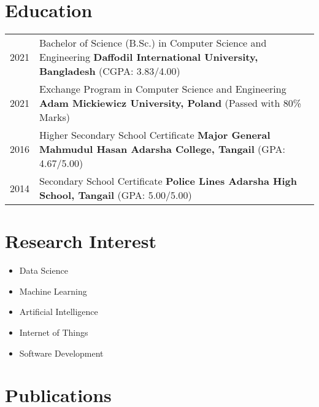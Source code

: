 \documentclass[a4paper, 12pt]{article}
\begin{document}
    \section{\textbf{Education}}
    \begin{tabularx}
    {\linewidth}{@{}l X@{}}
        2021 & Bachelor of Science (B.Sc.) in Computer Science
        and Engineering
        \newline
        \textbf{Daffodil International University, Bangladesh} \hfill (CGPA: 3.83/4.00)
        \\

        2021 & Exchange Program in Computer Science and Engineering
        \newline
        \textbf{Adam Mickiewicz University, Poland} \hfill (Passed with 80\% Marks)
        \\

        2016 & Higher Secondary School Certificate
        \newline
        \textbf{Major General Mahmudul Hasan Adarsha College, Tangail} \hfill (GPA:
        4.67/5.00) \\

        2014 & Secondary School Certificate
        \newline
        \textbf{Police Lines Adarsha High School, Tangail} \hfill (GPA: 5.00/5.00)
        \\
    \end{tabularx}


    \section{\textbf{Research Interest}}

    \begin{itemize}[leftmargin=*,itemsep=2pt,parsep=0pt]
        \item Data Science

        \item Machine Learning

        \item Artificial Intelligence

        \item Internet of Things

        \item Software Development
    \end{itemize}


    \section{\textbf{Publications}}
    \begin{refsection}
        \nocite{*}
        \printbibliography
        [heading=none]
    \end{refsection}
\end{document}
